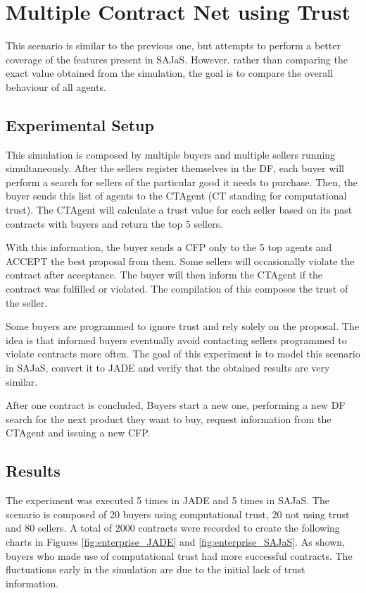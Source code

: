 \section{Multiple Contract Net using Trust}

This scenario is similar to the previous one, but attempts to perform a better coverage of the features present in SAJaS. However. rather than comparing the exact value obtained from the simulation, the goal is to compare the overall behaviour of all agents.

\subsection{Experimental Setup}
This simulation is composed by multiple buyers and multiple sellers running simultaneously. After the sellers register themselves in the DF, each buyer will perform a search for sellers of the particular good it needs to purchase. Then, the buyer sends this list of agents to the CTAgent (CT standing for computational trust). The CTAgent will calculate a trust value for each seller based on its past contracts with buyers and return the top 5 sellers.

With this information, the buyer sends a CFP only to the 5 top agents and ACCEPT the best proposal from them. Some sellers will occasionally violate the contract after acceptance. The buyer will then inform the CTAgent if the contract was fulfilled or violated. The compilation of this composes the trust of the seller.

Some buyers are programmed to ignore trust and rely solely on the proposal. The idea is that informed buyers eventually avoid contacting sellers programmed to violate contracts more often. The goal of this experiment is to model this scenario in SAJaS, convert it to JADE and verify that the obtained results are very similar.

After one contract is concluded, Buyers start a new one, performing a new DF search for the next product they want to buy, request information from the CTAgent and issuing a new CFP.

\subsection{Results}

The experiment was executed 5 times in JADE and 5 times in SAJaS. The scenario is composed of 20 buyers using computational trust, 20 not using trust and 80 sellers. A total of 2000 contracts were recorded to create the following charts in Figures \ref{fig:enterprise_JADE} and \ref{fig:enterprise_SAJaS}. As shown, buyers who made use of computational trust had more successful contracts. The fluctuations early in the simulation are due to the initial lack of trust information.

